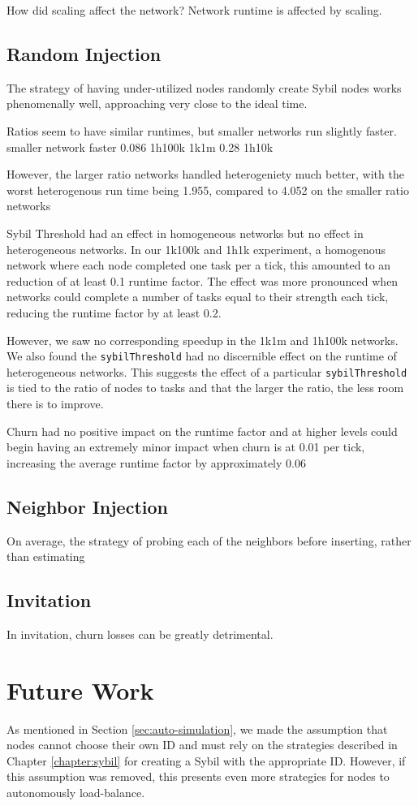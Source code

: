 How did scaling affect the network?  
Network runtime is affected by scaling.


\subsection{Random Injection}

The strategy of having under-utilized nodes randomly create Sybil nodes works phenomenally well, approaching very close to the ideal time.


Ratios seem to have similar runtimes, but smaller networks run slightly faster.
smaller network faster
0.086 1h100k 1k1m 
0.28 1h10k 


However, the larger ratio networks handled heterogeniety much better, with the worst heterogenous run time being 1.955, compared to 4.052 on  the smaller ratio networks


Sybil Threshold had an effect in homogeneous networks but no effect in heterogeneous networks.
In our 1k100k and 1h1k experiment, a homogenous network where each node completed one task per a tick, this amounted to an reduction of at least 0.1 runtime factor.
The effect was more pronounced when networks could complete a number of tasks equal to their strength each tick, reducing the runtime factor by at least 0.2.


However, we saw no corresponding speedup in the 1k1m and 1h100k networks.
We also found the \texttt{sybilThreshold} had no discernible effect on the runtime of heterogeneous networks.
This suggests the effect of a particular \texttt{sybilThreshold} is tied to the ratio of nodes to tasks and that the larger the ratio, the less room there is to improve.


Churn had no positive impact on the runtime factor and at higher levels could begin having an extremely minor impact when churn is at 0.01 per tick, increasing the average runtime factor by approximately 0.06 
\subsection{Neighbor Injection}


On average, the strategy of probing each of the neighbors before inserting, rather than estimating 
\subsection{Invitation}

In invitation, churn losses can be greatly detrimental.

\section{Future Work}

As mentioned in Section \ref{sec:auto-simulation}, we made the assumption that nodes cannot choose their own ID and must rely on the strategies described in Chapter \ref{chapter:sybil}  \cite{sybil-analysis} for creating a Sybil with the appropriate ID.
However, if this assumption was removed, this presents even more strategies for nodes to autonomously load-balance.